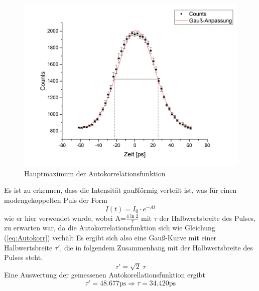 \begin{figure}[H]
	\begin{center}
		\includegraphics[scale=.5]{Bilder/Autokorr2.png}
		\caption{Hauptmaximum der Autokorrelationsfunktion}
		\label{aut2}
	\end{center}
\end{figure}
Es ist zu erkennen, dass die Intensität gaußförmig verteilt ist, was für einen modengekoppelten Puls der Form
\begin{equation*}
I(t)=I_0\cdot e^{-At}
\end{equation*}
wie er hier verwendet wurde, wobei A=$\frac{4\ln2}{\tau}$ mit $\tau$ der Halbwertsbreite des Pulses, zu erwarten war, da die Autokorrelationsfunktion sich wie Gleichung (\ref{eq:Autokorr}) verhält
Es ergibt sich also eine Gauß-Kurve mit einer Halbwertsbreite $\tau'$, die in folgendem Zusammenhang mit der Halbwertsbreite des Pulses steht.
\begin{equation}
\tau'=\sqrt{2}\:\tau
\end{equation}
Eine Auswertung der gemessenen Autokorellationsfunktion ergibt 
\begin{equation}
\tau'=48.677\text{ps}\Longrightarrow\tau=34.420\text{ps}
\end{equation}
